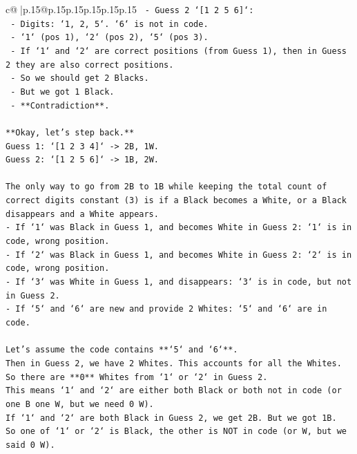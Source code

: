 \documentclass{article}
\begin{document}
{\begin{supertabular}{c@{$\;$}|p{.15\linewidth}@{}p{.15\linewidth}p{.15\linewidth}p{.15\linewidth}p{.15\linewidth}p{.15\linewidth}}
{{{\texttt{    {-} Guess 2 `{[}1 2 5 6{]}`:} \\
\texttt{        {-} Digits: `1, 2, 5`. `6` is not in code.} \\
\texttt{        {-} `1` (pos 1), `2` (pos 2), `5` (pos 3).} \\
\texttt{        {-} If `1` and `2` are correct positions (from Guess 1), then in Guess 2 they are also correct positions.} \\
\texttt{        {-} So we should get 2 Blacks.} \\
\texttt{        {-} But we got 1 Black.} \\
\texttt{        {-} **Contradiction**.} \\
\\ 
\texttt{**Okay, let's step back.**} \\
\texttt{Guess 1: `{[}1 2 3 4{]}` {-}> 2B, 1W.} \\
\texttt{Guess 2: `{[}1 2 5 6{]}` {-}> 1B, 2W.} \\
\\ 
\texttt{The only way to go from 2B to 1B while keeping the total count of correct digits constant (3) is if a Black becomes a White, or a Black disappears and a White appears.} \\
\texttt{{-} If `1` was Black in Guess 1, and becomes White in Guess 2: `1` is in code, wrong position.} \\
\texttt{{-} If `2` was Black in Guess 1, and becomes White in Guess 2: `2` is in code, wrong position.} \\
\texttt{{-} If `3` was White in Guess 1, and disappears: `3` is in code, but not in Guess 2.} \\
\texttt{{-} If `5` and `6` are new and provide 2 Whites: `5` and `6` are in code.} \\
\\ 
\texttt{Let's assume the code contains **`5` and `6`**.} \\
\texttt{Then in Guess 2, we have 2 Whites. This accounts for all the Whites.} \\
\texttt{So there are **0** Whites from `1` or `2` in Guess 2.} \\
\texttt{This means `1` and `2` are either both Black or both not in code (or one B one W, but we need 0 W).} \\
\texttt{If `1` and `2` are both Black in Guess 2, we get 2B. But we got 1B.} \\
\texttt{So one of `1` or `2` is Black, the other is NOT in code (or W, but we said 0 W).} \\
}}}
\end{supertabular}}
\end{document}
